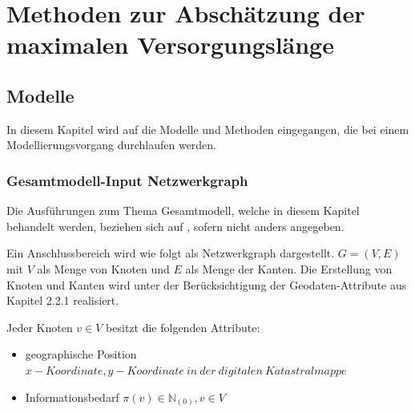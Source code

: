 \chapter{Methoden zur Abschätzung der maximalen Versorgungslänge}



\section{Modelle}
\label{sec:2methoden}

In diesem Kapitel wird auf die Modelle und Methoden eingegangen, die bei einem\\Modellierungsvorgang durchlaufen werden. 

\subsection{Gesamtmodell-Input Netzwerkgraph}
\label{sec:2 modelle}

\vspace{0.5cm}
Die Ausführungen zum Thema Gesamtmodell, welche in diesem Kapitel behandelt werden, beziehen sich auf \cite{pinkafeld1}, sofern nicht anders angegeben.
\\ 
\par Ein Anschlussbereich wird wie folgt als Netzwerkgraph dargestellt. $G=(V,E)$ mit $V$ als Menge von Knoten und $E$ als Menge der Kanten. 
Die Erstellung von Knoten und Kanten wird unter der Berücksichtigung der Geodaten-Attribute aus Kapitel 2.2.1 realisiert.

\vspace{0.3cm}
Jeder Knoten $v\in V$ besitzt die folgenden Attribute: 



\begin{itemize}
\item geographische Position $x-Koordinate, y-Koordinate ~in~ der~ digitalen~Katastralmappe ~$
\item Informationsbedarf $\pi(v) \in \mathds{N}_{(0)},v \in V~$
\end{itemize}


